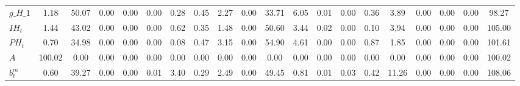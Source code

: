 \begin{center}
\begin{longtable}{lccccccccccccccccccc}
$g\_H\_1                    $	 & 	                1.18	 & 	               50.07	 & 	                0.00	 & 	                0.00	 & 	                0.00	 & 	                0.28	 & 	                0.45	 & 	                2.27	 & 	                0.00	 & 	               33.71	 & 	                6.05	 & 	                0.01	 & 	                0.00	 & 	                0.36	 & 	                3.89	 & 	                0.00	 & 	                0.00	 & 	                0.00	 & 	               98.27 \\ 
$IH_t                       $	 & 	                1.44	 & 	               43.02	 & 	                0.00	 & 	                0.00	 & 	                0.00	 & 	                0.62	 & 	                0.35	 & 	                1.48	 & 	                0.00	 & 	               50.60	 & 	                3.44	 & 	                0.02	 & 	                0.00	 & 	                0.10	 & 	                3.94	 & 	                0.00	 & 	                0.00	 & 	                0.00	 & 	              105.00 \\ 
$PH_t                       $	 & 	                0.70	 & 	               34.98	 & 	                0.00	 & 	                0.00	 & 	                0.00	 & 	                0.08	 & 	                0.47	 & 	                3.15	 & 	                0.00	 & 	               54.90	 & 	                4.61	 & 	                0.00	 & 	                0.00	 & 	                0.87	 & 	                1.85	 & 	                0.00	 & 	                0.00	 & 	                0.00	 & 	              101.61 \\ 
$ A                         $	 & 	              100.02	 & 	                0.00	 & 	                0.00	 & 	                0.00	 & 	                0.00	 & 	                0.00	 & 	                0.00	 & 	                0.00	 & 	                0.00	 & 	                0.00	 & 	                0.00	 & 	                0.00	 & 	                0.00	 & 	                0.00	 & 	                0.00	 & 	                0.00	 & 	                0.00	 & 	                0.00	 & 	              100.02 \\ 
$ b^m_t                     $	 & 	                0.60	 & 	               39.27	 & 	                0.00	 & 	                0.00	 & 	                0.01	 & 	                3.40	 & 	                0.29	 & 	                2.49	 & 	                0.00	 & 	               49.45	 & 	                0.81	 & 	                0.01	 & 	                0.03	 & 	                0.42	 & 	               11.26	 & 	                0.00	 & 	                0.00	 & 	                0.00	 & 	              108.06 \\ 

\end{longtable}
\end{center}
